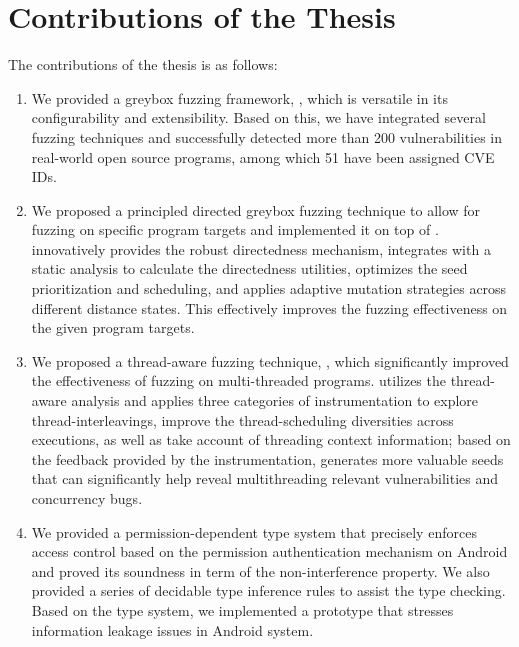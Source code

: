\section{Contributions of the Thesis}
The contributions of the thesis is as follows:
\begin{enumerate}
	\item We provided a greybox fuzzing framework, \FOT, which is versatile in its configurability and extensibility. Based on this, we have integrated several fuzzing techniques and successfully detected more than 200 vulnerabilities in real-world open source programs, among which 51 have been assigned CVE IDs.
	\item We proposed a principled directed greybox fuzzing technique \dFOT to allow for fuzzing on specific program targets and implemented it on top of \FOT. \dFOT innovatively provides the robust directedness mechanism, integrates with a static analysis to calculate the directedness utilities, optimizes the seed prioritization and scheduling, and applies adaptive mutation strategies across different distance states. This effectively improves the fuzzing effectiveness on the given program targets.
	\item We proposed a thread-aware fuzzing technique, \mtfuzz, which significantly improved the effectiveness of fuzzing on multi-threaded programs. \mtfuzz utilizes the thread-aware analysis and applies three categories of instrumentation to explore thread-interleavings,  improve the thread-scheduling diversities across executions, as well as take account of threading context information; based on the feedback provided by the instrumentation, \mtfuzz generates more valuable seeds that can significantly help reveal multithreading relevant vulnerabilities and concurrency bugs.
	\item We provided a permission-dependent type system that precisely enforces access control based on the permission authentication mechanism on Android and proved its soundness in term of the non-interference property. We also provided a series of decidable type inference rules to assist the type checking. Based on the type system, we implemented a prototype that stresses information leakage issues in Android system.
\end{enumerate}


